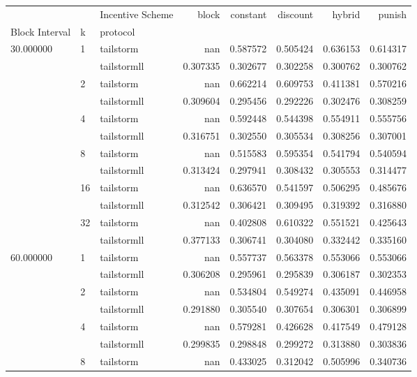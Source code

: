 \begin{tabular}{lllrrrrr}
 &  & Incentive Scheme & block & constant & discount & hybrid & punish \\
Block Interval & k & protocol &  &  &  &  &  \\
\multirow[c]{12}{*}{30.000000} & \multirow[c]{2}{*}{1} & tailstorm & nan & 0.587572 & 0.505424 & 0.636153 & 0.614317 \\
 &  & tailstormll & 0.307335 & 0.302677 & 0.302258 & 0.300762 & 0.300762 \\
 & \multirow[c]{2}{*}{2} & tailstorm & nan & 0.662214 & 0.609753 & 0.411381 & 0.570216 \\
 &  & tailstormll & 0.309604 & 0.295456 & 0.292226 & 0.302476 & 0.308259 \\
 & \multirow[c]{2}{*}{4} & tailstorm & nan & 0.592448 & 0.544398 & 0.554911 & 0.555756 \\
 &  & tailstormll & 0.316751 & 0.302550 & 0.305534 & 0.308256 & 0.307001 \\
 & \multirow[c]{2}{*}{8} & tailstorm & nan & 0.515583 & 0.595354 & 0.541794 & 0.540594 \\
 &  & tailstormll & 0.313424 & 0.297941 & 0.308432 & 0.305553 & 0.314477 \\
 & \multirow[c]{2}{*}{16} & tailstorm & nan & 0.636570 & 0.541597 & 0.506295 & 0.485676 \\
 &  & tailstormll & 0.312542 & 0.306421 & 0.309495 & 0.319392 & 0.316880 \\
 & \multirow[c]{2}{*}{32} & tailstorm & nan & 0.402808 & 0.610322 & 0.551521 & 0.425643 \\
 &  & tailstormll & 0.377133 & 0.306741 & 0.304080 & 0.332442 & 0.335160 \\
\multirow[c]{12}{*}{60.000000} & \multirow[c]{2}{*}{1} & tailstorm & nan & 0.557737 & 0.563378 & 0.553066 & 0.553066 \\
 &  & tailstormll & 0.306208 & 0.295961 & 0.295839 & 0.306187 & 0.302353 \\
 & \multirow[c]{2}{*}{2} & tailstorm & nan & 0.534804 & 0.549274 & 0.435091 & 0.446958 \\
 &  & tailstormll & 0.291880 & 0.305540 & 0.307654 & 0.306301 & 0.306899 \\
 & \multirow[c]{2}{*}{4} & tailstorm & nan & 0.579281 & 0.426628 & 0.417549 & 0.479128 \\
 &  & tailstormll & 0.299835 & 0.298848 & 0.299272 & 0.313880 & 0.303836 \\
 & \multirow[c]{2}{*}{8} & tailstorm & nan & 0.433025 & 0.312042 & 0.505996 & 0.340736 \\

\end{tabular}

